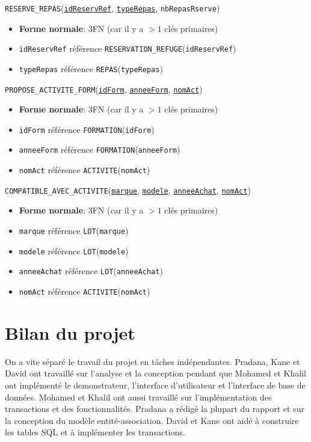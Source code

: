 \documentclass[12pt, a4paper]{article}
\newcommand\att[1]{\textnhtt{#1}}
\begin{document}
\att{RESERVE\_REPAS}(\att{\underline{idReservRef}}, \att{\underline{typeRepas}}, \att{nbRepasRserve})
\begin{itemize}
\item \textbf{Forme normale}: 3FN (car il y a $>1$ clés primaires)
\item \att{idReservRef} référence \att{RESERVATION\_REFUGE}(\att{idReservRef})
\item \att{typeRepas} référence \att{REPAS}(\att{typeRepas})
\end{itemize}

\att{PROPOSE\_ACTIVITE\_FORM}(\att{\underline{idForm}}, \att{\underline{anneeForm}}, \att{\underline{nomAct}})
\begin{itemize}
\item \textbf{Forme normale}: 3FN (car il y a $>1$ clés primaires)
\item \att{idForm} référence \att{FORMATION}(\att{idForm})
\item \att{anneeForm} référence \att{FORMATION}(\att{anneeForm})
\item \att{nomAct} référence \att{ACTIVITE}(\att{nomAct})
\end{itemize}

\att{COMPATIBLE\_AVEC\_ACTIVITE}(\att{\underline{marque}}, \att{\underline{modele}}, \att{\underline{anneeAchat}}, \att{\underline{nomAct}})
\begin{itemize}
\item \textbf{Forme normale}: 3FN (car il y a $>1$ clés primaires)
\item \att{marque} référence \att{LOT}(\att{marque})
\item \att{modele} référence \att{LOT}(\att{modele})
\item \att{anneeAchat} référence \att{LOT}(\att{anneeAchat})
\item \att{nomAct} référence \att{ACTIVITE}(\att{nomAct})
\end{itemize}


\section{Bilan du projet}
On a vite séparé le travail du projet en tâches indépendantes.
Pradana, Kane et David ont travaillé sur l'analyse et la conception pendant que Mohamed et Khalil ont implémenté le demonstrateur, l'interface d'utilisateur et l'interface de base de données.
Mohamed et Khalil ont aussi travaillé sur l'implémentation des transactions et des fonctionnalités.
Pradana a rédigé la plupart du rapport et sur la conception du modèle entité-association.
David et Kane ont aidé à construire les tables SQL et à implémenter les transactions. 

\end{document}
